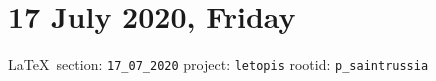 
 
\section{17 July 2020, Friday}
  
\vspace{0.5cm}
{\small\LaTeX~section: \verb|17_07_2020| project: \verb|letopis| rootid: \verb|p_saintrussia|}
\vspace{0.5cm}

  
